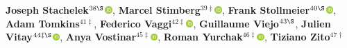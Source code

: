 \textbf{Joseph Stachelek}$^{38\S}$\href{http://orcid.org/0000-0002-5924-2464}{\includegraphics[width=8pt]{orcid}},
\textbf{Marcel Stimberg}$^{39\ddagger}$\href{http://orcid.org/0000-0002-2648-4790}{\includegraphics[width=8pt]{orcid}},
\textbf{Frank Stollmeier}$^{40\S}$\href{http://orcid.org/0000-0003-4858-0895}{\includegraphics[width=8pt]{orcid}},
\textbf{Adam Tomkins}$^{41\ddagger}$,
\textbf{Federico Vaggi}$^{42\ddagger}$\href{http://orcid.org/0000-0001-8100-158X}{\includegraphics[width=8pt]{orcid}},
\textbf{Guillaume Viejo}$^{43\S}$,
\textbf{Julien Vitay}$^{44\ddagger\S}$\href{http://orcid.org/0000-0001-5229-2349}{\includegraphics[width=8pt]{orcid}},
\textbf{Anya Vostinar}$^{45\ddagger}$\href{http://orcid.org/0000-0001-7216-5283}{\includegraphics[width=8pt]{orcid}},
\textbf{Roman Yurchak}$^{46\ddagger}$\href{http://orcid.org/0000-0002-2565-4444}{\includegraphics[width=8pt]{orcid}},
\textbf{Tiziano Zito}$^{47\dagger}$\\
